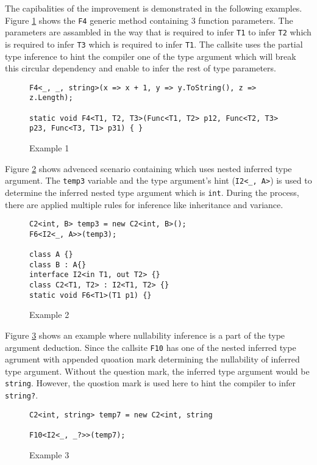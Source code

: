 The capibalities of the improvement is demonstrated in the following examples.
Figure \ref{img73:example1} shows the \texttt{F4} generic method containing 3 function parameters.
The parameters are assambled in the way that is required to infer \texttt{T1} to infer \texttt{T2} which is required to infer \texttt{T3} which is required to infer \texttt{T1}.
The callsite uses the partial type inference to hint the compiler one of the type argument which will break this circular dependency and enable to infer the rest of type parameters.
\begin{figure}[h]
\begin{lstlisting}[style=csharp, showstringspaces=false]
F4<_, _, string>(x => x + 1, y => y.ToString(), z => z.Length); 

static void F4<T1, T2, T3>(Func<T1, T2> p12, Func<T2, T3> p23, Func<T3, T1> p31) { }
\end{lstlisting}
\caption{Example 1}
\label{img73:example1}
\end{figure}
Figure \ref{img74:example2} shows advenced scenario containing which uses nested inferred type argument.
The \texttt{temp3} variable and the type argument's hint (\texttt{I2<\_, A>}) is used to determine the inferred nested type argument which is \texttt{int}.
During the process, there are applied multiple rules for inference like inheritance and variance.
\begin{figure}[h]
\begin{lstlisting}[style=csharp, showstringspaces=false]
C2<int, B> temp3 = new C2<int, B>();
F6<I2<_, A>>(temp3);

class A {}
class B : A{}
interface I2<in T1, out T2> {}
class C2<T1, T2> : I2<T1, T2> {}
static void F6<T1>(T1 p1) {}
\end{lstlisting}
\caption{Example 2}
\label{img74:example2}
\end{figure}
Figure \ref{img75:example3} shows an example where nullability inference is a part of the type argument deduction.
Since the callsite \texttt{F10} has one of the nested inferred type agrument with appended quoation mark determining the nullability of inferred type argument.
Without the question mark, the inferred type argument would be \texttt{string}.
However, the quostion mark is used here to hint the compiler to infer \texttt{string?}.
\begin{figure}[h]
\begin{lstlisting}[style=csharp, showstringspaces=false]
C2<int, string> temp7 = new C2<int, string

F10<I2<_, _?>>(temp7);
\end{lstlisting}
\caption{Example 3}
\label{img75:example3}
\end{figure}

